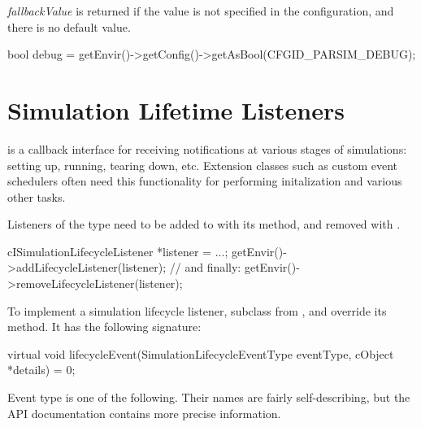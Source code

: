 \textit{fallbackValue} is returned if the value is not specified in the configuration,
and there is no default value.

\begin{cpp}
bool debug = getEnvir()->getConfig()->getAsBool(CFGID_PARSIM_DEBUG);
\end{cpp}


\section{Simulation Lifetime Listeners}
\label{sec:plugin-exts:simulation-lifetime-listeners}

 is a callback interface for
receiving notifications at various stages of simulations: setting up,
running, tearing down, etc. Extension classes such as custom event
schedulers often need this functionality for performing initalization
and various other tasks.

Listeners of the type  need to be
added to  with its  method,
and removed with .

\begin{cpp}
cISimulationLifecycleListener *listener = ...;
getEnvir()->addLifecycleListener(listener);
// and finally:
getEnvir()->removeLifecycleListener(listener);
\end{cpp}

To implement a simulation lifecycle listener, subclass from
, and override its
 method. It has the following signature:

\begin{cpp}
virtual void lifecycleEvent(SimulationLifecycleEventType eventType, cObject *details) = 0;
\end{cpp}


Event type is one of the following. Their names are fairly self-describing,
but the API documentation contains more precise information.

